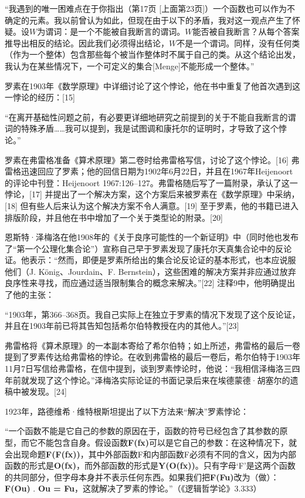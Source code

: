 “我遇到的唯一困难点在于你指出（第17页 [上面第23页]）一个函数也可以作为不确定的元素。我以前曾认为如此，但现在由于以下的矛盾，我对这一观点产生了怀疑。设\(W\)为谓词：是一个不能被自我断言的谓词。\(W\)能否被自我断言？从每个答案推导出相反的结论。因此我们必须得出结论，\(W\)不是一个谓词。同样，没有任何类（作为一个整体）包含那些每个被当作整体时不属于自己的类。从这个结论出发，我认为在某些情况下，一个可定义的集合[Menge]不能形成一个整体。”

罗素在1903年《数学原理》中详细讨论了这个悖论，他在书中重复了他首次遇到这一悖论的经历：[15]

“在离开基础性问题之前，有必要更详细地研究之前提到的关于不能自我断言的谓词的特殊矛盾……我可以提到，我是试图调和康托尔的证明时，才导致了这个悖论。”

罗素在弗雷格准备《算术原理》第二卷时给弗雷格写信，讨论了这个悖论。[16] 弗雷格迅速回应了罗素；他的回信日期为1902年6月22日，并且在1967年Heijenoort的评论中刊登：Heijenoort 1967:126–127。弗雷格随后写了一篇附录，承认了这一悖论，[17] 并提出了一个解决方案，这个方案后来被罗素在《数学原理》中采纳，[18] 但有些人后来认为这个解决方案不令人满意。[19] 至于罗素，他的书籍已进入排版阶段，并且他在书中增加了一个关于类型论的附录。[20]

恩斯特·泽梅洛在他1908年的《关于良序可能性的一个新证明》中（同时他也发布了“第一个公理化集合论”）宣称自己早于罗素发现了康托尔天真集合论中的反论证。他表示：“然而，即便是罗素所给出的集合论反论证的基本形式，也本应说服他们（J. König、Jourdain、F. Bernstein），这些困难的解决方案并非应通过放弃良序性来寻找，而应通过适当限制集合的概念来解决。”[22] 注释9中，他明确提出了他的主张：

“1903年，第366–368页。我自己实际上在独立于罗素的情况下发现了这个反论证，并且在1903年前已将其告知包括希尔伯特教授在内的其他人。”[23]

弗雷格将《算术原理》的一本副本寄给了希尔伯特；如上所述，弗雷格的最后一卷提到了罗素传达给弗雷格的悖论。在收到弗雷格的最后一卷后，希尔伯特于1903年11月7日写信给弗雷格，在信中提到，谈到罗素悖论时，他说：“我相信泽梅洛三四年前就发现了这个悖论。”泽梅洛实际论证的书面记录后来在埃德蒙德·胡塞尔的遗稿中被发现。[24]

1923年，路德维希·维特根斯坦提出了以下方法来“解决”罗素悖论：

“一个函数不能是它自己的参数的原因在于，函数的符号已经包含了其参数的原型，而它不能包含自身。假设函数\textbf{F(fx)}可以是它自己的参数：在这种情况下，就会出现命题\textbf{F(F(fx))}，其中外部函数F和内部函数F必须有不同的含义，因为内部函数的形式是\textbf{O(fx)}，而外部函数的形式是\textbf{Y(O(fx))}。只有字母‘F’是这两个函数的共同部分，但字母本身并不表示任何东西。如果我们把\textbf{F(Fu)}改为（做）：\textbf{F(Ou)} . \textbf{Ou = Fu}，这就解决了罗素的悖论。”（《逻辑哲学论》3.333）

